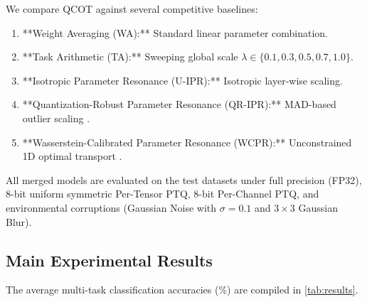 \documentclass{article}
\theoremstyle{plain}
\theoremstyle{definition}
\theoremstyle{remark}
\begin{document}
We compare QCOT against several competitive baselines:
\begin{enumerate}
    \item **Weight Averaging (WA):** Standard linear parameter combination.
    \item **Task Arithmetic (TA):** Sweeping global scale $\lambda \in \{0.1, 0.3, 0.5, 0.7, 1.0\}$.
    \item **Isotropic Parameter Resonance (U-IPR):** Isotropic layer-wise scaling.
    \item **Quantization-Robust Parameter Resonance (QR-IPR):** MAD-based outlier scaling \cite{Leclaire2024IPR}.
    \item **Wasserstein-Calibrated Parameter Resonance (WCPR):** Unconstrained 1D optimal transport \cite{Leclaire2024IPR}.
\end{enumerate}

All merged models are evaluated on the test datasets under full precision (FP32), 8-bit uniform symmetric Per-Tensor PTQ, 8-bit Per-Channel PTQ, and environmental corruptions (Gaussian Noise with $\sigma=0.1$ and $3 \times 3$ Gaussian Blur).

\subsection{Main Experimental Results}
The average multi-task classification accuracies (\%) are compiled in \cref{tab:results}.
\end{document}
